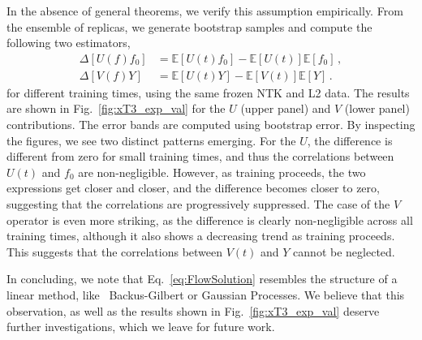 In the absence of general theorems, we verify this assumption empirically.
From the ensemble of replicas, we generate bootstrap samples and compute the
following two estimators,
\begin{align}
    \label{eq:DeltaExpValUtF0}
    \Delta[U(f)f_0] &= \mathbb{E}\left[U(t) f_{0}\right] 
      - \mathbb{E}\left[U(t) \right] \mathbb{E}\left[f_{0}\right]\, , \\
    \label{eq:DeltaExpValVtY}
    \Delta[V(f)Y] &= \mathbb{E}\left[U(t) Y\right] 
      - \mathbb{E}\left[V(t) \right] \mathbb{E}\left[Y\right]\, .
\end{align}
for different training times, using the same frozen NTK and L2 data. The results
are shown in Fig.~\ref{fig:xT3_exp_val} for the $U$ (upper panel) and $V$ (lower
panel) contributions. The error bands are computed using bootstrap error. By
inspecting the figures, we see two distinct patterns emerging. For the $U$, the
difference is different from zero for small training times, and thus the
correlations between $U(t)$ and $f_0$ are non-negligible. However, as training
proceeds, the two expressions get closer and closer, and the difference becomes
closer to zero, suggesting that the correlations are progressively suppressed.
The case of the $V$ operator is even more striking, as the difference is clearly
non-negligible across all training times, although it also shows a decreasing trend as
training proceeds. This suggests that the correlations between $V(t)$ and $Y$
cannot be neglected. 

In concluding, we note that Eq.~\eqref{eq:FlowSolution} resembles the structure
of a linear method, like \eg\ Backus-Gilbert or Gaussian Processes. We believe
that this observation, as well as the results shown in
Fig.~\ref{fig:xT3_exp_val} deserve further investigations, which we leave for
future work.

